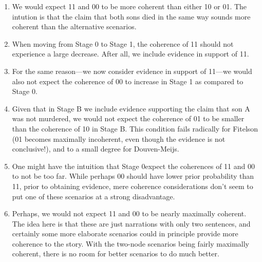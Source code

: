 \documentclass[10pt,]{scrartcl}
\begin{document}
\begin{enumerate}
    \item We would expect 11 and 00 to be more coherent than either 10 or 01. The intution is that the claim that both sons died in the same way sounds more coherent than the alternative scenarios.  %
    
    \item When moving from Stage 0 to Stage 1, the coherence of 11 should not experience a large decrease. After all, we include evidence in support of 11. %

    \item For the same reason---we now consider evidence in support of 11---we would also not expect the coherence of 00 to increase in \textsf{Stage 1} as compared to \textsf{Stage 0}. 
    
    \item Given that in Stage B we include evidence supporting the claim that son A was not murdered, we would not expect the coherence of 01 to be smaller than the coherence of 10 in Stage B. This condition fails radically for Fitelson (01 becomes maximally incoherent, even though the evidence is not conclusive!), and to a small degree for Douven-Meijs.

    \item  One might have the intuition that \textsf{Stage 0}expect the coherences of 11 and 00 to not be too far. While perhaps 00 should have lower prior probability than 11,  prior to obtaining evidence, mere coherence considerations don't seem to put one of these scenarios at a strong disadvantage.
    \item Perhaps, we would not expect 11 and 00 to be nearly maximally coherent. The idea here is that these are just narrations with only two sentences, and certainly some more elaborate scenarios could in principle provide more coherence to the story. With the two-node scenarios being fairly maximally coherent, there is no room for better scenarios to do much better.  
\end{enumerate}
\end{document}
